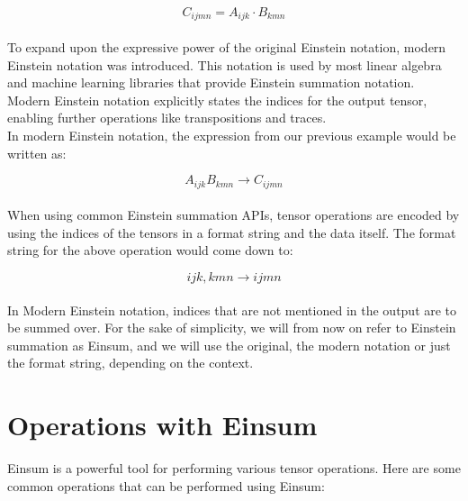 \[C_{ijmn} = A_{ijk} \cdot B_{kmn}\]
\noindent
\\
To expand upon the expressive power of the original Einstein notation, modern Einstein
notation was introduced. This notation is used by most linear algebra and machine
learning libraries that provide Einstein summation notation. Modern Einstein notation
explicitly states the indices for the output tensor, enabling further operations like
transpositions and traces.\\
In modern Einstein notation, the expression from our previous example would
be written as:

\[A_{ijk}B_{kmn} \rightarrow C_{ijmn}\]
\noindent
\\
When using common Einstein summation APIs, tensor operations are encoded by using the
indices of the tensors in a format string and the data itself.
\newpage
\noindent
The format string for the above operation would come down to:

\[ijk,kmn \rightarrow ijmn\]
\noindent
\\
In Modern Einstein notation, indices that are not mentioned in the output are to be
summed over. For the sake of simplicity, we will from now on refer to Einstein summation
as Einsum, and we will use the original, the modern notation or just the format
string, depending on the context.

\section{Operations with Einsum}
Einsum is a powerful tool for performing various tensor operations. Here are some
common operations that can be performed using Einsum:


